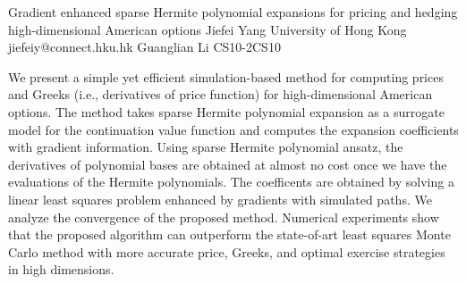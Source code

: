\begin{talk}
  {Gradient enhanced sparse Hermite polynomial expansions for pricing and hedging high-dimensional American options}%
  {Jiefei Yang}%
  {University of Hong Kong}%
  {jiefeiy@connect.hku.hk}%
  {Guanglian Li}%
{}{}{CS10-2}{CS10}

			
We present a simple yet efficient simulation-based method for computing prices and Greeks (i.e., derivatives of price function) for high-dimensional American options. The method takes sparse Hermite polynomial expansion as a surrogate model for the continuation value function and computes the expansion coefficients with gradient information. Using sparse Hermite polynomial ansatz, the derivatives of polynomial bases are obtained at almost no cost once we have the evaluations of the Hermite polynomials. The coefficents are obtained by solving a linear least squares problem enhanced by gradients with simulated paths. We analyze the convergence of the proposed method. Numerical experiments show that the proposed algorithm can outperform the state-of-art least squares Monte Carlo method with more accurate price, Greeks, and optimal exercise strategies in high dimensions. 

\medskip


\end{talk}

